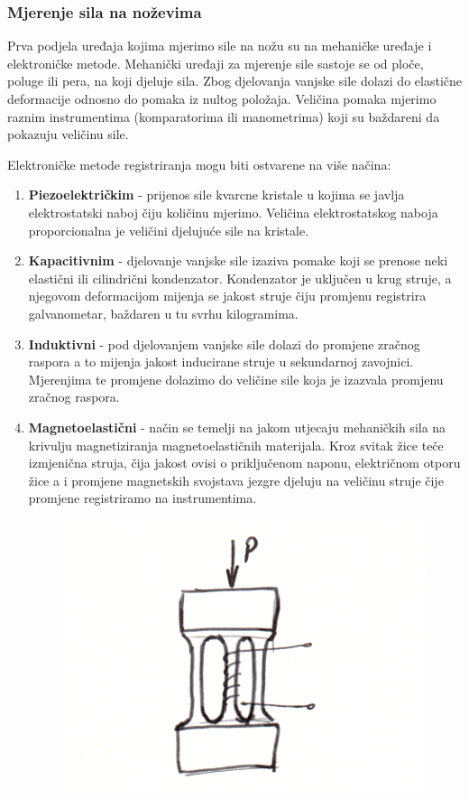 \documentclass[a4paper,12pt]{article}
\numberwithin{figure}{section}
\begin{document}
\subsubsection{Mjerenje sila na noževima}
Prva podjela uređaja kojima mjerimo sile na nožu su na mehaničke uređaje i elektroničke metode. Mehanički uređaji za mjerenje sile sastoje se od ploče, poluge ili pera, na koji djeluje sila. Zbog djelovanja vanjske sile dolazi do elastične deformacije odnosno do pomaka iz nultog položaja. Veličina pomaka mjerimo raznim instrumentima (komparatorima ili manometrima) koji su baždareni da pokazuju veličinu sile.\par
Elektroničke metode registriranja mogu biti ostvarene na više načina:
\begin{enumerate}
\item \textbf{Piezoelektričkim} - prijenos sile kvarcne kristale u kojima se javlja elektrostatski naboj čiju količinu mjerimo. Veličina elektrostatskog naboja proporcionalna je veličini djelujuće sile na kristale.
\item \textbf{Kapacitivnim} - djelovanje vanjske sile izaziva pomake koji se prenose neki elastični ili cilindrični kondenzator. Kondenzator je uključen u krug struje, a njegovom deformacijom mijenja se jakost struje čiju promjenu registrira galvanometar, baždaren u tu svrhu kilogramima.
\item \textbf{Induktivni} - pod djelovanjem vanjske sile dolazi do promjene zračnog raspora a to mijenja jakost inducirane struje u sekundarnoj zavojnici. Mjerenjima te promjene dolazimo do veličine sile koja je izazvala promjenu zračnog raspora.
\item \textbf{Magnetoelastični} - način se temelji na jakom utjecaju mehaničkih sila na krivulju magnetiziranja magnetoelastičnih materijala. Kroz svitak žice teče izmjenična struja, čija jakost ovisi o priključenom naponu, električnom otporu žice a i promjene magnetskih svojstava jezgre djeluju na veličinu struje čije promjene registriramo na instrumentima.
\begin{figure}[!h]
\includegraphics[scale=0.2]{image_10-1.png}

\end{figure}
\end{enumerate}
\end{document}
